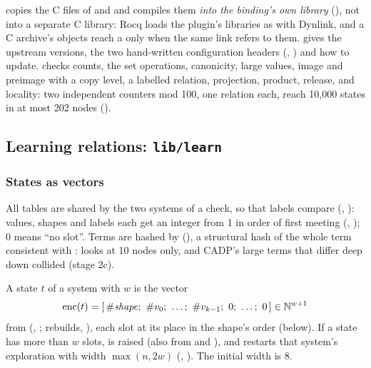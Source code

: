  copies the C files of  and
 and compiles them
\emph{into the binding's own library} (), not into a separate C library: Rocq loads the plugin's
libraries as  with Dynlink, and a C archive's objects reach a
 only when the same link refers to them.
 gives the upstream versions, the two
hand-written configuration headers (,
) and how to update.  checks counts, the set
operations, canonicity, large values, image and preimage with a copy
level, a labelled relation, projection, product, release, and locality:
two independent counters mod 100, one relation each, reach 10,000 states
in at most 202 nodes ().

\subsection{Learning relations: \texttt{lib/learn}}\label{sec:sym-learn}

\subsubsection{States as vectors}

All tables are shared by the two systems of a check, so that labels
compare (, ): values,
shapes and labels each get an integer from 1 in order of first meeting
(, ); 0 means ``no slot''.
Terms are hashed by  (),
a structural hash of the whole term consistent with :
 looks at 10 nodes only, and CADP's large terms that
differ deep down collided (stage 2c).

A state $t$ of a system with  $w$ is the vector
\[
\mathrm{enc}(t) = [\,\#\mathit{shape};\ \#v_0;\ \dots;\ \#v_{k-1};\
0;\ \dots;\ 0\,] \in \mathbb{N}^{w+1}
\]
from  (,
;  rebuilds,
), each slot at its place in the
shape's order (below). If a state has more than $w$ slots,
 is raised (also from  and
), and  restarts that system's exploration
with width $\max(n, 2w)$ (\code{run_explore},
). The initial width is 8.

